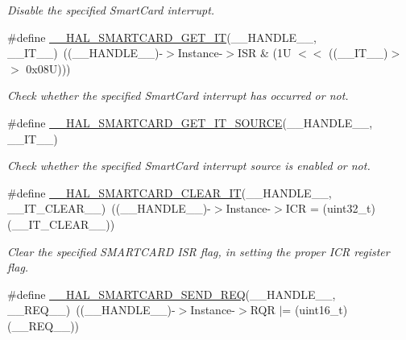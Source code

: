 \begin{DoxyCompactItemize}
\begin{DoxyCompactList}\small\item\em Disable the specified Smart\+Card interrupt. \end{DoxyCompactList}\item 
\#define \hyperlink{group___s_m_a_r_t_c_a_r_d___exported___macros_ga62044144c25ce71029a64c7264f5d17b}{\+\_\+\+\_\+\+H\+A\+L\+\_\+\+S\+M\+A\+R\+T\+C\+A\+R\+D\+\_\+\+G\+E\+T\+\_\+\+IT}(\+\_\+\+\_\+\+H\+A\+N\+D\+L\+E\+\_\+\+\_\+,  \+\_\+\+\_\+\+I\+T\+\_\+\+\_\+)~((\+\_\+\+\_\+\+H\+A\+N\+D\+L\+E\+\_\+\+\_\+)-\/$>$Instance-\/$>$I\+SR \& (1\+U $<$$<$ ((\+\_\+\+\_\+\+I\+T\+\_\+\+\_\+)$>$$>$ 0x08\+U)))
\begin{DoxyCompactList}\small\item\em Check whether the specified Smart\+Card interrupt has occurred or not. \end{DoxyCompactList}\item 
\#define \hyperlink{group___s_m_a_r_t_c_a_r_d___exported___macros_ga8bae0fc7f068414790697698adafc4f2}{\+\_\+\+\_\+\+H\+A\+L\+\_\+\+S\+M\+A\+R\+T\+C\+A\+R\+D\+\_\+\+G\+E\+T\+\_\+\+I\+T\+\_\+\+S\+O\+U\+R\+CE}(\+\_\+\+\_\+\+H\+A\+N\+D\+L\+E\+\_\+\+\_\+,  \+\_\+\+\_\+\+I\+T\+\_\+\+\_\+)
\begin{DoxyCompactList}\small\item\em Check whether the specified Smart\+Card interrupt source is enabled or not. \end{DoxyCompactList}\item 
\#define \hyperlink{group___s_m_a_r_t_c_a_r_d___exported___macros_ga06c69ad04f6b90fe6926271c4c3cc90c}{\+\_\+\+\_\+\+H\+A\+L\+\_\+\+S\+M\+A\+R\+T\+C\+A\+R\+D\+\_\+\+C\+L\+E\+A\+R\+\_\+\+IT}(\+\_\+\+\_\+\+H\+A\+N\+D\+L\+E\+\_\+\+\_\+,  \+\_\+\+\_\+\+I\+T\+\_\+\+C\+L\+E\+A\+R\+\_\+\+\_\+)~((\+\_\+\+\_\+\+H\+A\+N\+D\+L\+E\+\_\+\+\_\+)-\/$>$Instance-\/$>$I\+CR = (uint32\+\_\+t)(\+\_\+\+\_\+\+I\+T\+\_\+\+C\+L\+E\+A\+R\+\_\+\+\_\+))
\begin{DoxyCompactList}\small\item\em Clear the specified S\+M\+A\+R\+T\+C\+A\+RD I\+SR flag, in setting the proper I\+CR register flag. \end{DoxyCompactList}\item 
\#define \hyperlink{group___s_m_a_r_t_c_a_r_d___exported___macros_ga3fcb368e836670a140dedbc5ae6c3a35}{\+\_\+\+\_\+\+H\+A\+L\+\_\+\+S\+M\+A\+R\+T\+C\+A\+R\+D\+\_\+\+S\+E\+N\+D\+\_\+\+R\+EQ}(\+\_\+\+\_\+\+H\+A\+N\+D\+L\+E\+\_\+\+\_\+,  \+\_\+\+\_\+\+R\+E\+Q\+\_\+\+\_\+)~((\+\_\+\+\_\+\+H\+A\+N\+D\+L\+E\+\_\+\+\_\+)-\/$>$Instance-\/$>$R\+QR $\vert$= (uint16\+\_\+t)(\+\_\+\+\_\+\+R\+E\+Q\+\_\+\+\_\+))

\end{DoxyCompactItemize}

